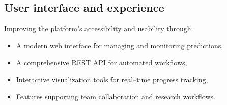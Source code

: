 \subsection{User interface and experience}
Improving the platform's accessibility and usability through:
\begin{itemize}
    \item A modern web interface for managing and monitoring predictions,
    \item A comprehensive REST API for automated workflows,
    \item Interactive visualization tools for real--time progress tracking,
    \item Features supporting team collaboration and research workflows.
\end{itemize}
%
%
%
%
